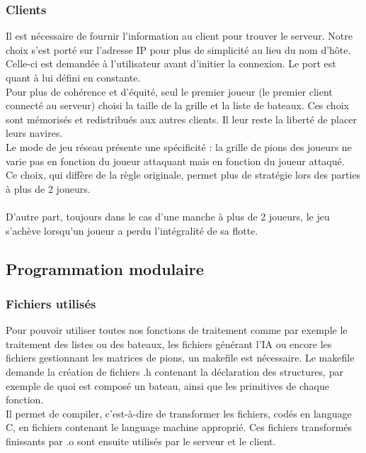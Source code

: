 \documentclass[a4paper,12pt]{article}
\begin{document}
\subsubsection {Clients}
Il est nécessaire de fournir l'information au client pour trouver le serveur. Notre choix s'est porté sur l'adresse IP pour plus de simplicité au lieu du nom d'hôte.
    Celle-ci est demandée à l'utilisateur avant d'initier la connexion. Le port est quant à lui défini en constante.
    \vspace{2\baselineskip}
\\  Pour plus de cohérence et d'équité, seul le premier joueur (le premier client connecté au serveur) choisi la taille de la grille et la liste de bateaux. Ces choix sont mémorisés et redistribués aux autres clients. Il leur reste la liberté de placer leurs navires.
    \vspace{2\baselineskip}
\\ Le mode de jeu réseau présente une spécificité : la grille de pions des joueurs ne varie pas en fonction du joueur attaquant mais en fonction du joueur attaqué.
\\ Ce choix, qui diffère de la règle originale, permet plus de stratégie lors des parties à plus de 2 joueurs.\\
\vspace{2\baselineskip}
\\ D'autre part, toujours dans le cas d'une manche à plus de 2 joueurs, le jeu s'achève lorsqu'un joueur a perdu l'intégralité de sa flotte.

\newpage
\subsection{Programmation modulaire}
\subsubsection{Fichiers utilisés}
    Pour pouvoir utiliser toutes nos fonctions de traitement comme par exemple le traitement des listes ou des bateaux, les fichiers générant l'IA ou encore les fichiers gestionnant les matrices de pions, un makefile est nécessaire.
    Le makefile demande la création de fichiers .h contenant la déclaration des structures, par exemple de quoi est composé un bateau, ainsi que les primitives de chaque fonction. \\
    Il permet de compiler, c'est-à-dire de transformer les fichiers, codés en language C, en fichiers contenant le language machine approprié. Ces fichiers transformés finissants par .o sont ensuite utilisés par le serveur et le client.
\end{document}
